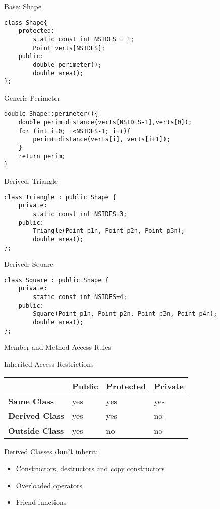 \documentclass[xcolor={dvipsnames}]{beamer}
\begin{document}
\begin{frame}[fragile]{Base: Shape}
\begin{verbatim}
class Shape{
    protected:
        static const int NSIDES = 1;
        Point verts[NSIDES];
    public:
        double perimeter();
        double area();
};
\end{verbatim}
\end{frame}

\begin{frame}[fragile]{Generic Perimeter}
\begin{verbatim}
double Shape::perimeter(){
    double perim=distance(verts[NSIDES-1],verts[0]);
    for (int i=0; i<NSIDES-1; i++){
        perim+=distance(verts[i], verts[i+1]);
    }
    return perim;
}
\end{verbatim}
\end{frame}

\begin{frame}[fragile]{Derived: Triangle}
\begin{verbatim}
class Triangle : public Shape {
    private:
        static const int NSIDES=3;
    public:
        Triangle(Point p1n, Point p2n, Point p3n);
        double area();
};
\end{verbatim}
\end{frame}

\begin{frame}[fragile]{Derived: Square}
\begin{verbatim}
class Square : public Shape {
    private:
        static const int NSIDES=4;
    public:
        Square(Point p1n, Point p2n, Point p3n, Point p4n);
        double area();
};
\end{verbatim}
\end{frame}

\begin{frame}{Member and Method Access Rules}
	\begin{block}{Inherited Access Restrictions}
	\begin{center}
	\begin{tabular}{l|l|l|l}
		  & \textbf{Public} & \textbf{Protected} & \textbf{Private}\\\hline
		\textbf{Same Class} & yes & yes & yes\\
		\textbf{Derived Class} & yes & yes & no\\
		\textbf{Outside Class} & yes & no & no\\
	\end{tabular}
	\end{center}
	\end{block}
\pause
\begin{block}{Derived Classes \textbf{don't} inherit:}
	\begin{itemize}
		\item Constructors, destructors and copy constructors
		\item Overloaded operators
		\item Friend functions
	\end{itemize}
\end{block}
\end{frame}
\end{document}
